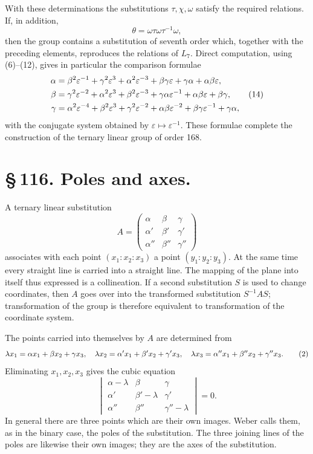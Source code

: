 \documentclass[11pt]{article}
\newcommand{\eps}{\varepsilon}
\newcommand{\mat}[1]{\begin{pmatrix}#1\end{pmatrix}}
\begin{document}
With these determinations the substitutions \(\tau,\chi,\omega\) satisfy the required relations. If, in addition,
\begin{equation}
\theta=\omega\tau\omega\tau^{-1}\omega,
\tag{13}
\end{equation}
then the group contains a substitution of seventh order which, together with the preceding elements, reproduces the relations of \(L_7\). Direct computation, using (6)--(12), gives in particular the comparison formulae
\begin{align}
\alpha&=\beta^2\eps^{-1}+\gamma^2\eps^3+\alpha^2\eps^{-3}+\beta\gamma\eps+\gamma\alpha+\alpha\beta\eps,\notag\\
\beta&=\gamma^2\eps^{-2}+\alpha^2\eps^3+\beta^2\eps^{-3}+\gamma\alpha\eps^{-1}+\alpha\beta\eps+\beta\gamma,\tag{14}\\
\gamma&=\alpha^2\eps^{-4}+\beta^2\eps^3+\gamma^2\eps^{-2}+\alpha\beta\eps^{-2}+\beta\gamma\eps^{-1}+\gamma\alpha,\notag
\end{align}
with the conjugate system obtained by \(\eps\mapsto\eps^{-1}\). These formulae complete the construction of the ternary linear group of order 168.

\section*{\S\,116. Poles and axes.}

A ternary linear substitution
\begin{equation}
A=\mat{\alpha&\beta&\gamma\\\alpha'&\beta'&\gamma'\\\alpha''&\beta''&\gamma''}
\tag{1}
\end{equation}
associates with each point \((x_1:x_2:x_3)\) a point \((y_1:y_2:y_3)\). At the same time every straight line is carried into a straight line. The mapping of the plane into itself thus expressed is a collineation. If a second substitution \(S\) is used to change coordinates, then \(A\) goes over into the transformed substitution \(S^{-1}AS\); transformation of the group is therefore equivalent to transformation of the coordinate system.

The points carried into themselves by \(A\) are determined from
\begin{equation}
\lambda x_1=\alpha x_1+\beta x_2+\gamma x_3,\notag
\quad
\lambda x_2=\alpha'x_1+\beta'x_2+\gamma'x_3,\notag
\quad
\lambda x_3=\alpha''x_1+\beta''x_2+\gamma''x_3.
\tag{2}
\end{equation}
Eliminating \(x_1,x_2,x_3\) gives the cubic equation
\begin{equation}
\begin{vmatrix}
\alpha-\lambda&\beta&\gamma\\
\alpha'&\beta'-\lambda&\gamma'\\
\alpha''&\beta''&\gamma''-\lambda
\end{vmatrix}=0.
\tag{3}
\end{equation}
In general there are three points which are their own images. Weber calls them, as in the binary case, the poles of the substitution. The three joining lines of the poles are likewise their own images; they are the axes of the substitution.
\end{document}
